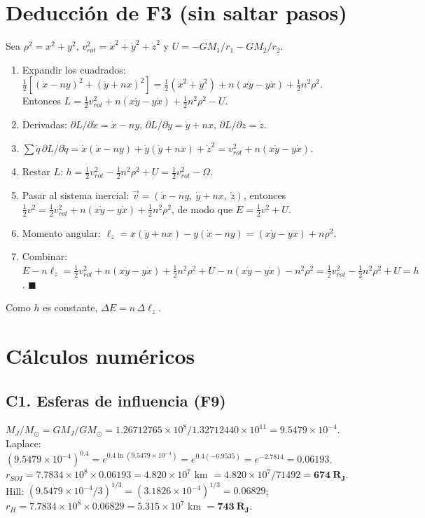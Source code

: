 \documentclass[11pt,letterpaper]{article}
\begin{document}
\section{Deducción de F3 (sin saltar pasos)}
Sea $\rho^2=x^2+y^2$, $v_{rot}^2=\dot x^2+\dot y^2+\dot z^2$ y $U=-GM_1/r_1-GM_2/r_2$.
\begin{enumerate}
\item Expandir los cuadrados: $\tfrac12[(\dot x-ny)^2+(\dot y+nx)^2]=\tfrac12(\dot x^2+\dot y^2)+n(x\dot y-y\dot x)+\tfrac12n^2\rho^2$. Entonces $L=\tfrac12v_{rot}^2+n(x\dot y-y\dot x)+\tfrac12n^2\rho^2-U$.
\item Derivadas: $\partial L/\partial\dot x=\dot x-ny$, $\partial L/\partial\dot y=\dot y+nx$, $\partial L/\partial\dot z=\dot z$.
\item $\sum\dot q\,\partial L/\partial\dot q=\dot x(\dot x-ny)+\dot y(\dot y+nx)+\dot z^2=v_{rot}^2+n(x\dot y-y\dot x)$.
\item Restar $L$: $h=\tfrac12v_{rot}^2-\tfrac12n^2\rho^2+U=\tfrac12v_{rot}^2-\Omega$.
\item Pasar al sistema inercial: $\vec v=(\dot x-ny,\ \dot y+nx,\ \dot z)$, entonces $\tfrac12v^2=\tfrac12v_{rot}^2+n(x\dot y-y\dot x)+\tfrac12n^2\rho^2$, de modo que $E=\tfrac12v^2+U$.
\item Momento angular: $\ell_z=x(\dot y+nx)-y(\dot x-ny)=(x\dot y-y\dot x)+n\rho^2$.
\item Combinar: $E-n\ell_z=\tfrac12v_{rot}^2+n(x\dot y-y\dot x)+\tfrac12n^2\rho^2+U-n(x\dot y-y\dot x)-n^2\rho^2=\tfrac12v_{rot}^2-\tfrac12n^2\rho^2+U=h$. $\blacksquare$
\end{enumerate}
Como $h$ es constante, $\Delta E=n\,\Delta\ell_z$.

\section{Cálculos numéricos}

\subsection*{C1. Esferas de influencia (F9)}
$M_J/M_\odot=GM_J/GM_\odot=1.26712765\times10^{8}/1.32712440\times10^{11}=9.5479\times10^{-4}$.\\
Laplace: $(9.5479\times10^{-4})^{0.4}=e^{0.4\ln(9.5479\times10^{-4})}=e^{0.4(-6.9535)}=e^{-2.7814}=0.06193$.\\
$r_{SOI}=7.7834\times10^{8}\times0.06193=4.820\times10^{7}$ km $=4.820\times10^7/71492=\mathbf{674\ R_J}$.\\
Hill: $(9.5479\times10^{-4}/3)^{1/3}=(3.1826\times10^{-4})^{1/3}=0.06829$; $r_H=7.7834\times10^8\times0.06829=5.315\times10^7$ km $=\mathbf{743\ R_J}$.
\end{document}

